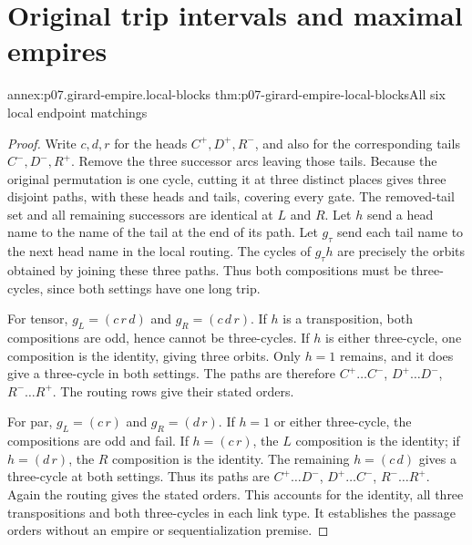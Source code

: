\section{Original trip intervals and maximal empires}

\begin{annexitem}{annex:p07.girard-empire.local-blocks}
 {thm:p07-girard-empire-local-blocks}{All six local endpoint matchings}
\begin{proof}
Write \(c,d,r\) for the heads \(C^+,D^+,R^-\), and also for the
corresponding tails \(C^-,D^-,R^+\).
Remove the three successor arcs leaving those tails.
Because the original permutation is one cycle, cutting it at three
distinct places gives three disjoint paths, with these heads and tails,
covering every gate. The removed-tail set and all remaining successors
are identical at \(L\) and \(R\).
Let \(h\) send a head name to the name of the tail at the end of its
path. Let \(g_\tau\) send each tail name to the next head name in
the local routing. The cycles of \(g_\tau h\) are precisely the
orbits obtained by joining these three paths. Thus both compositions
must be three-cycles, since both settings have one long trip.

For tensor, \(g_L=(c\,r\,d)\) and \(g_R=(c\,d\,r)\).
If \(h\) is a transposition, both compositions are odd, hence cannot
be three-cycles. If \(h\) is either three-cycle, one composition is
the identity, giving three orbits. Only \(h=1\) remains, and it does
give a three-cycle in both settings. The paths are therefore
\(C^+\ldots C^-\), \(D^+\ldots D^-\), \(R^-\ldots R^+\).
The routing rows give their stated orders.

For par, \(g_L=(c\,r)\) and \(g_R=(d\,r)\).
If \(h=1\) or either three-cycle, the compositions are odd and fail.
If \(h=(c\,r)\), the \(L\) composition is the identity; if
\(h=(d\,r)\), the \(R\) composition is the identity.
The remaining \(h=(c\,d)\) gives a three-cycle at both settings.
Thus its paths are \(C^+\ldots D^-\), \(D^+\ldots C^-\),
\(R^-\ldots R^+\). Again the routing gives the stated orders.
This accounts for the identity, all three transpositions and both
three-cycles in each link type. It establishes the passage orders
without an empire or sequentialization premise.
\end{proof}
\end{annexitem}

